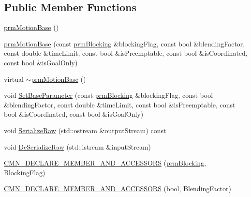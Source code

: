 \subsection*{Public Member Functions}
\begin{DoxyCompactItemize}
\item 
\hyperlink{classprm_motion_base_acde671630db715f3bbb57eb7aef0d63a}{prm\-Motion\-Base} ()
\item 
\hyperlink{classprm_motion_base_a266b99c3dcd37bf69b7e51a38694e5dd}{prm\-Motion\-Base} (const \hyperlink{prm_forward_declarations_8h_aef1d8aa0eac2eaf31e9a97334a725d8f}{prm\-Blocking} \&blocking\-Flag, const bool \&blending\-Factor, const double \&time\-Limit, const bool \&is\-Preemptable, const bool \&is\-Coordinated, const bool \&is\-Goal\-Only)
\item 
virtual \hyperlink{classprm_motion_base_a36fcb1e4bbecb67bb513093c0e3761f9}{$\sim$prm\-Motion\-Base} ()
\item 
void \hyperlink{classprm_motion_base_a9a8d6f1ddfab22529c604421fcca63a4}{Set\-Base\-Parameter} (const \hyperlink{prm_forward_declarations_8h_aef1d8aa0eac2eaf31e9a97334a725d8f}{prm\-Blocking} \&blocking\-Flag, const bool \&blending\-Factor, const double \&time\-Limit, const bool \&is\-Preemptable, const bool \&is\-Coordinated, const bool \&is\-Goal\-Only)
\item 
void \hyperlink{classprm_motion_base_a6d3429f196533973be97119c95b12a7c}{Serialize\-Raw} (std\-::ostream \&output\-Stream) const 
\item 
void \hyperlink{classprm_motion_base_ae7d6c7a2092cf287552067509bfe1339}{De\-Serialize\-Raw} (std\-::istream \&input\-Stream)
\end{DoxyCompactItemize}
{\bf }\par
\begin{DoxyCompactItemize}
\item 
\hyperlink{classprm_motion_base_a18eccebaf0719eec31196d87f14d6fc8}{C\-M\-N\-\_\-\-D\-E\-C\-L\-A\-R\-E\-\_\-\-M\-E\-M\-B\-E\-R\-\_\-\-A\-N\-D\-\_\-\-A\-C\-C\-E\-S\-S\-O\-R\-S} (\hyperlink{prm_forward_declarations_8h_aef1d8aa0eac2eaf31e9a97334a725d8f}{prm\-Blocking}, Blocking\-Flag)
\end{DoxyCompactItemize}

{\bf }\par
\begin{DoxyCompactItemize}
\item 
\hyperlink{classprm_motion_base_ae70237b7dd3fe713f97b0582af47ce4c}{C\-M\-N\-\_\-\-D\-E\-C\-L\-A\-R\-E\-\_\-\-M\-E\-M\-B\-E\-R\-\_\-\-A\-N\-D\-\_\-\-A\-C\-C\-E\-S\-S\-O\-R\-S} (bool, Blending\-Factor)
\end{DoxyCompactItemize}

